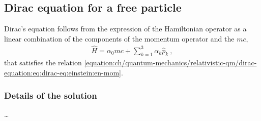 \documentclass[letterpaper,10pt,english]{jupyterBook}
\begin{document}
\subsection{Dirac equation for a free particle}
\label{\detokenize{ch/quantum-mechanics/relativistic-qm/dirac-equation:dirac-equation-for-a-free-particle}}\label{\detokenize{ch/quantum-mechanics/relativistic-qm/dirac-equation:quantum-mechanics-relativistic-dirac-equation-dirac-free}}
\sphinxAtStartPar
Dirac’s equation follows from the expression of the Hamiltonian operator as a linear combination of the components of the momentum operator and the \(m c\),
\begin{equation*}
\begin{split}\hat{H} = \alpha_0 m c + \sum_{k=1}^{3} \alpha_k \hat{p}_k \ ,\end{split}
\end{equation*}
\sphinxAtStartPar
that satisfies the relation \eqref{equation:ch/quantum-mechanics/relativistic-qm/dirac-equation:eq:dirac-eq:einstein:en-mom}.
\subsubsection*{Details of the solution}

\sphinxAtStartPar
{}…
\end{document}
